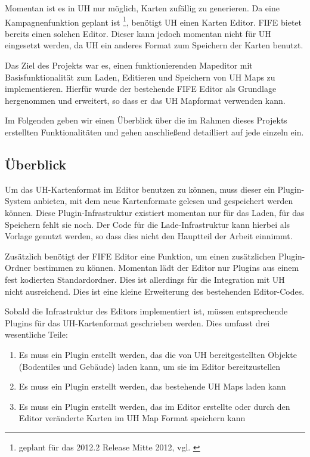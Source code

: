 Momentan ist es in UH nur möglich, Karten zufällig zu generieren. Da eine
Kampagnenfunktion geplant ist \footnote{geplant für das 2012.2 Release Mitte 2012, vgl.
\cite{roadmap}}, benötigt UH einen Karten Editor. FIFE bietet bereits einen solchen Editor.
Dieser kann jedoch momentan nicht für UH eingesetzt werden, da UH ein anderes Format
zum Speichern der Karten benutzt.

Das Ziel des Projekts war es, einen funktionierenden Mapeditor mit Basisfunktionalität
zum Laden, Editieren und Speichern von UH Maps zu implementieren. Hierfür wurde
der bestehende FIFE Editor als Grundlage hergenommen und erweitert, so dass er das
UH Mapformat verwenden kann.

Im Folgenden geben wir einen Überblick über die im Rahmen dieses Projekts erstellten
Funktionalitäten und gehen anschließend detailliert auf jede einzeln ein.

\subsection{Überblick}
Um das UH-Kartenformat im Editor benutzen zu können, muss dieser ein Plugin-System
anbieten, mit dem neue Kartenformate gelesen und gespeichert werden können. Diese
Plugin-Infrastruktur existiert momentan nur für das Laden, für das Speichern fehlt sie
noch. Der Code für die Lade-Infrastruktur kann hierbei als Vorlage genutzt werden, so
dass dies nicht den Hauptteil der Arbeit einnimmt.

Zusätzlich benötigt der FIFE Editor eine Funktion, um einen zusätzlichen Plugin-Ordner
bestimmen zu können. Momentan lädt der Editor nur Plugins aus einem fest kodierten
Standardordner. Dies ist allerdings für die Integration mit UH nicht ausreichend. Dies ist
eine kleine Erweiterung des bestehenden Editor-Codes.

Sobald die Infrastruktur des Editors implementiert ist, müssen entsprechende Plugins für
das UH-Kartenformat geschrieben werden. Dies umfasst drei wesentliche Teile:

\begin{enumerate}
\item Es muss ein Plugin erstellt werden, das die von UH bereitgestellten Objekte
(Bodentiles und Gebäude) laden kann, um sie im Editor bereitzustellen
\item Es muss ein Plugin erstellt werden, das bestehende UH Maps laden kann
\item Es muss ein Plugin erstellt werden, das im Editor erstellte oder durch den Editor
veränderte Karten im UH Map Format speichern kann
\end{enumerate}

